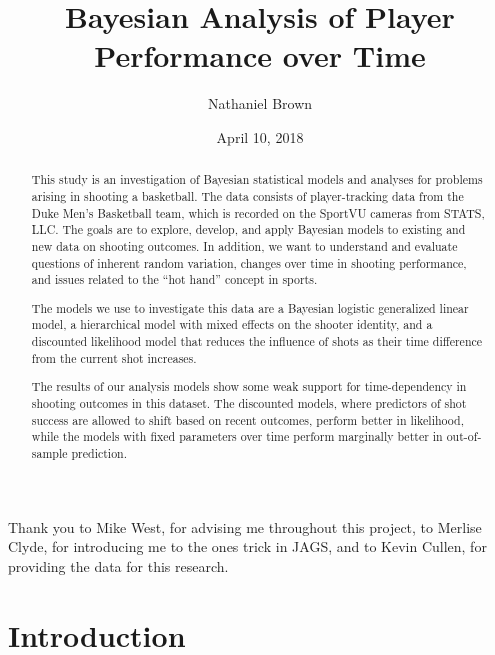 \documentclass[12pt,twoside]{dukestatscithesis}
\title{Bayesian Analysis of Player Performance over Time}
\author{Nathaniel Brown}
\date{April 10, 2018}
\theoremstyle{definition}
\theoremstyle{definition}
\theoremstyle{definition}
\theoremstyle{remark}
\begin{document}
  \maketitle

\frontmatter %
\pagestyle{empty} %
  \begin{acknowledgements}
    Thank you to Mike West, for advising me throughout this project, to
    Merlise Clyde, for introducing me to the ones trick in JAGS, and to
    Kevin Cullen, for providing the data for this research.
  \end{acknowledgements}

  \hypersetup{linkcolor=black}
  \setcounter{tocdepth}{2}
  \tableofcontents

  \listoftables

  \listoffigures
  \begin{abstract}
    This study is an investigation of Bayesian statistical models and
    analyses for problems arising in shooting a basketball. The data
    consists of player-tracking data from the Duke Men's Basketball team,
    which is recorded on the SportVU cameras from STATS, LLC. The goals are
    to explore, develop, and apply Bayesian models to existing and new data
    on shooting outcomes. In addition, we want to understand and evaluate
    questions of inherent random variation, changes over time in shooting
    performance, and issues related to the ``hot hand'' concept in sports.
    
    The models we use to investigate this data are a Bayesian logistic
    generalized linear model, a hierarchical model with mixed effects on the
    shooter identity, and a discounted likelihood model that reduces the
    influence of shots as their time difference from the current shot
    increases.
    
    The results of our analysis models show some weak support for
    time-dependency in shooting outcomes in this dataset. The discounted
    models, where predictors of shot success are allowed to shift based on
    recent outcomes, perform better in likelihood, while the models with
    fixed parameters over time perform marginally better in out-of-sample
    prediction.
  \end{abstract}

\mainmatter %
\pagestyle{fancyplain} %

\chapter*{Introduction}\label{introduction}
\end{document}
